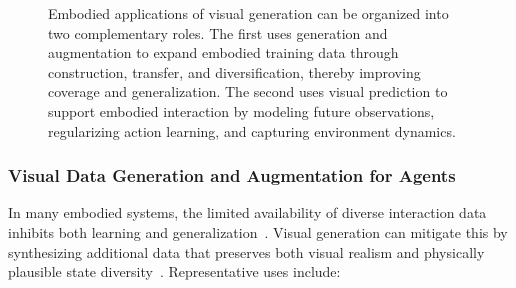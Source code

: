 \documentclass{llmxive}
\begin{document}
\begin{figure}[!htbp]
\caption{Embodied applications of visual generation can be organized into two complementary roles. 
The first uses generation and augmentation to expand embodied training data through construction, transfer, and diversification, thereby improving coverage and generalization. 
The second uses visual prediction to support embodied interaction by modeling future observations, regularizing action learning, and capturing environment dynamics.}
\label{fig:embodied_visual_generation}
\end{figure}

\subsubsection{Visual Data Generation and Augmentation for Agents}

In many embodied systems, the limited availability of diverse interaction data inhibits both learning and generalization~\citep{khazatsky2024droid,openx2024rtx,walke2023bridgedatav2}. Visual generation can mitigate this by synthesizing additional data that preserves both visual realism and physically plausible state diversity~\citep{chen2024roviaug,lepert2025phantom,li2025h2r,lepert2025masquerade,fan2026robopaint,song2025mitty}. Representative uses include:
\end{document}

